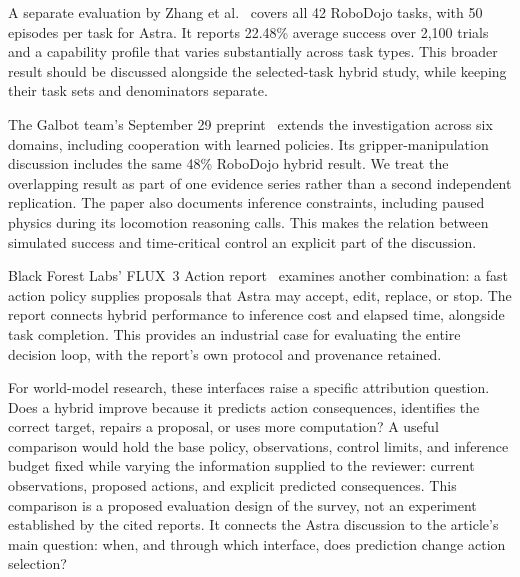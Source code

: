 A separate evaluation by Zhang et al.~\cite{zhang2026unexpected} covers all 42 RoboDojo tasks, with 50 episodes per task for Astra. It reports 22.48\% average success over 2,100 trials and a capability profile that varies substantially across task types. This broader result should be discussed alongside the selected-task hybrid study, while keeping their task sets and denominators separate.

The Galbot team's September 29 preprint~\cite{galbot2026astra} extends the investigation across six domains, including cooperation with learned policies. Its gripper-manipulation discussion includes the same 48\% RoboDojo hybrid result. We treat the overlapping result as part of one evidence series rather than a second independent replication. The paper also documents inference constraints, including paused physics during its locomotion reasoning calls. This makes the relation between simulated success and time-critical control an explicit part of the discussion.

Black Forest Labs' FLUX~3 Action report~\cite{bfl2026flux3action} examines another combination: a fast action policy supplies proposals that Astra may accept, edit, replace, or stop. The report connects hybrid performance to inference cost and elapsed time, alongside task completion. This provides an industrial case for evaluating the entire decision loop, with the report's own protocol and provenance retained.

For world-model research, these interfaces raise a specific attribution question. Does a hybrid improve because it predicts action consequences, identifies the correct target, repairs a proposal, or uses more computation? A useful comparison would hold the base policy, observations, control limits, and inference budget fixed while varying the information supplied to the reviewer: current observations, proposed actions, and explicit predicted consequences. This comparison is a proposed evaluation design of the survey, not an experiment established by the cited reports. It connects the Astra discussion to the article's main question: when, and through which interface, does prediction change action selection?

